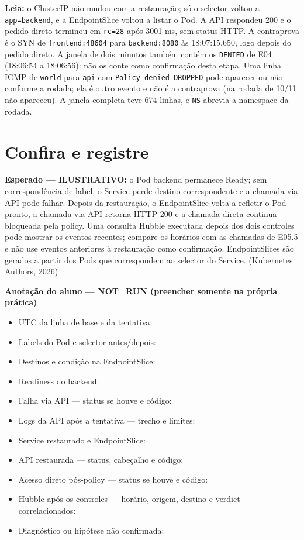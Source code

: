 \documentclass[12pt,openany,oneside,a4paper,chapter=TITLE,english,brazil]{abntex2}
\providecommand{\tightlist}{\setlength{\itemsep}{0pt}\setlength{\parskip}{0pt}}
\begin{document}
\textbf{Leia:} o ClusterIP não mudou com a restauração; só o selector voltou a \texttt{app=\allowbreak{}backend}, e a EndpointSlice voltou a listar o Pod. A API respondeu 200 e o pedido direto terminou em \texttt{rc=\allowbreak{}28} após 3001 ms, sem status HTTP. A contraprova é o SYN de \texttt{frontend:\allowbreak{}48604} para \texttt{backend:\allowbreak{}8080} às 18:07:15.650, logo depois do pedido direto. A janela de dois minutos também contém os \texttt{DENIED} de E04 (18:06:54 a 18:06:56): não os conte como confirmação desta etapa. Uma linha ICMP de \texttt{world} para \texttt{api} com \texttt{Policy denied DROPPED} pode aparecer ou não conforme a rodada; ela é outro evento e não é a contraprova (na rodada de 10/11 não apareceu). A janela completa teve 674 linhas, e \texttt{NS} abrevia a namespace da rodada.

\section*{Confira e registre}\label{confira-e-registre-4}

\textbf{Esperado --- ILUSTRATIVO:} o Pod backend permanece Ready; sem correspondência de label, o Service perde destino correspondente e a chamada via API pode falhar. Depois da restauração, o EndpointSlice volta a refletir o Pod pronto, a chamada via API retorna HTTP 200 e a chamada direta continua bloqueada pela policy. Uma consulta Hubble executada depois dos dois controles pode mostrar os eventos recentes; compare os horários com as chamadas de E05.5 e não use eventos anteriores à restauração como confirmação. EndpointSlices são gerados a partir dos Pods que correspondem ao selector do Service. (Kubernetes Authors, 2026)

\textbf{Anotação do aluno --- NOT\_RUN (preencher somente na própria prática)}

\begin{itemize}
\tightlist
\item
  UTC da linha de base e da tentativa: \hrulefill
\item
  Labels do Pod e selector antes/depois: \hrulefill
\item
  Destinos e condição na EndpointSlice: \hrulefill
\item
  Readiness do backend: \hrulefill
\item
  Falha via API --- status se houve e código: \hrulefill
\item
  Logs da API após a tentativa --- trecho e limites: \hrulefill
\item
  Service restaurado e EndpointSlice: \hrulefill
\item
  API restaurada --- status, cabeçalho e código: \hrulefill
\item
  Acesso direto pós-policy --- status se houve e código: \hrulefill
\item
  Hubble após os controles --- horário, origem, destino e verdict correlacionados: \hrulefill
\item
  Diagnóstico ou hipótese não confirmada: \hrulefill
\end{itemize}
\end{document}
